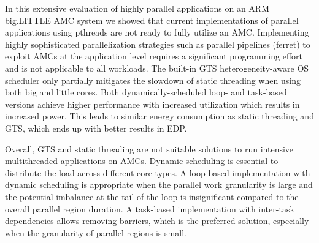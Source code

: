 In this extensive evaluation of highly parallel applications on an ARM big.LITTLE AMC system 
we showed that current implementations of parallel applications using pthreads are not ready to fully utilize an AMC.
Implementing highly sophisticated parallelization strategies such as parallel pipelines (ferret) to exploit AMCs at the application level requires a significant programming effort and is not applicable to all workloads.
The built-in GTS heterogeneity-aware OS scheduler only partially mitigates the slowdown of static threading when using both big and little cores.
Both dynamically-scheduled loop- and task-based versions achieve higher performance with increased utilization which results in increased power. This leads to similar energy consumption as static threading and GTS, which ends up with better results in EDP.

Overall, GTS and static threading are not suitable solutions to run intensive multithreaded applications on AMCs. Dynamic scheduling is essential to distribute the load across different core types. A loop-based implementation with dynamic scheduling is appropriate when the parallel work granularity is large and the potential imbalance at the tail of the loop is insignificant compared to the overall parallel region duration. A task-based implementation with inter-task dependencies allows removing barriers, which is the preferred solution, especially when the granularity of parallel regions is small.

